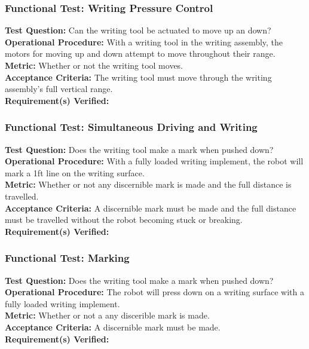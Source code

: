 \subsubsection{Functional Test: Writing Pressure Control}
\label{test:writing_ft_pressure}
\textbf{Test Question:} Can the writing tool be actuated to move up an down?\\
\textbf{Operational Procedure:} With a writing tool in the writing assembly, the motors for moving up and down attempt to move throughout their range. \\
\textbf{Metric:} Whether or not the writing tool moves.\\
\textbf{Acceptance Criteria:} The writing tool must move through the writing assembly's full vertical range. \\
\textbf{Requirement(s) Verified:} 

\subsubsection{Functional Test: Simultaneous Driving and Writing}
\label{test:writing_ft_both}
\textbf{Test Question:} Does the writing tool make a mark when pushed down? \\
\textbf{Operational Procedure:} With a fully loaded writing implement, the robot will mark a 1ft line on the writing surface.\\
\textbf{Metric:} Whether or not any discernible mark is made and the full distance is travelled. \\
\textbf{Acceptance Criteria:} A discernible mark must be made and the full distance must be travelled without the robot becoming stuck or breaking.\\
\textbf{Requirement(s) Verified:} 

\subsubsection{Functional Test: Marking}
\label{test:writing_ft_mark}
\textbf{Test Question:} Does the writing tool make a mark when pushed down? \\
\textbf{Operational Procedure:} The robot will press down on a writing surface with a fully loaded writing implement. \\
\textbf{Metric:} Whether or not a any discerible mark is made. \\
\textbf{Acceptance Criteria:} A discernible mark must be made.\\
\textbf{Requirement(s) Verified:} 

